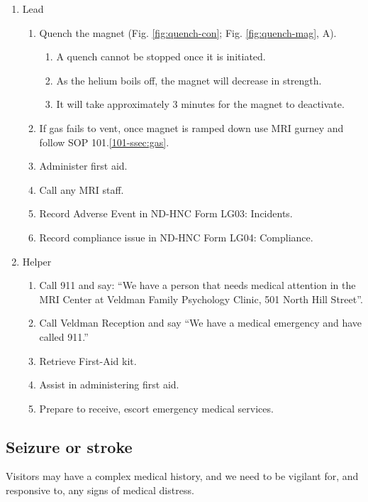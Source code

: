 \documentclass[11pt]{article}
\begin{document}
\begin{enumerate}
	\item Lead
	\begin{enumerate}
		\item Quench the magnet (Fig. \ref{fig:quench-con}; Fig. \ref{fig:quench-mag}, A).
		\begin{enumerate}
			\item A quench cannot be stopped once it is initiated.
			\item As the helium boils off, the magnet will decrease in strength.
			\item It will take approximately 3 minutes for the magnet to deactivate.
		\end{enumerate}
		\item If gas fails to vent, once magnet is ramped down use MRI gurney and follow SOP 101.\ref{101-ssec:gas}.
		\item Administer first aid.
		\item Call any MRI staff.
		\item Record Adverse Event in ND-HNC Form LG03: Incidents.
		\item Record compliance issue in ND-HNC Form LG04: Compliance.
	\end{enumerate}

	\item Helper
	\begin{enumerate}
		\item Call 911 and say: ``We have a person that needs medical attention in the MRI Center at Veldman Family Psychology Clinic, 501 North Hill Street''.
		\item Call Veldman Reception and say ``We have a medical emergency and have called 911.''
		\item Retrieve First-Aid kit.
		\item Assist in administering first aid.
		\item Prepare to receive, escort emergency medical services.
	\end{enumerate}
\end{enumerate}


\subsection{Seizure or stroke}
\label{ssec:metal-seizure}

Visitors may have a complex medical history, and we need to be vigilant for, and responsive to, any signs of medical distress.
\end{document}
